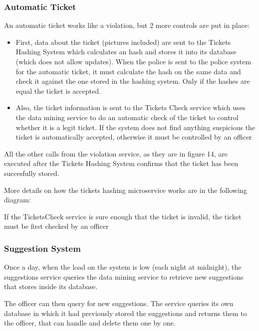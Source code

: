 \subsubsection{Automatic Ticket}
An automatic ticket works like a violation, but 2 more controls are put in place:
\begin{itemize}
    \item First, data about the ticket (pictures included) are sent to the Tickets Hashing System which calculates an hash and stores it into its database (which does not allow updates). When the police is sent to the police system for the automatic ticket, it must calculate the hash on the same data and check it against the one stored in the hashing system. Only if the hashes are equal the ticket is accepted.
    \item Also, the ticket information is sent to the Tickets Check service which uses the data mining service to do an automatic check of the ticket to control whether it is a legit ticket. If the system does not find anything suspicious the ticket is automatically accepted, otherwise it must be controlled by an officer
\end{itemize}
All the other calls from the violation service, as they are in figure 14, are executed after the Tickets Hashing System confirms that the ticket has been succesfully stored.


More details on how the tickets hashing microservice works are in the following diagram:


If the TicketsCheck service is sure enough that the ticket is invalid, the ticket must be first checked by an officer


\subsubsection{Suggestion System}
Once a day, when the load on the system is low (each night at midnight), the suggestions service queries the data mining service to retrieve new suggestions that stores inside its database.

The officer can then query for new suggestions. The service queries its own database in which it had previously stored the suggestions and returns them to the officer, that can handle and delete them one by one.

